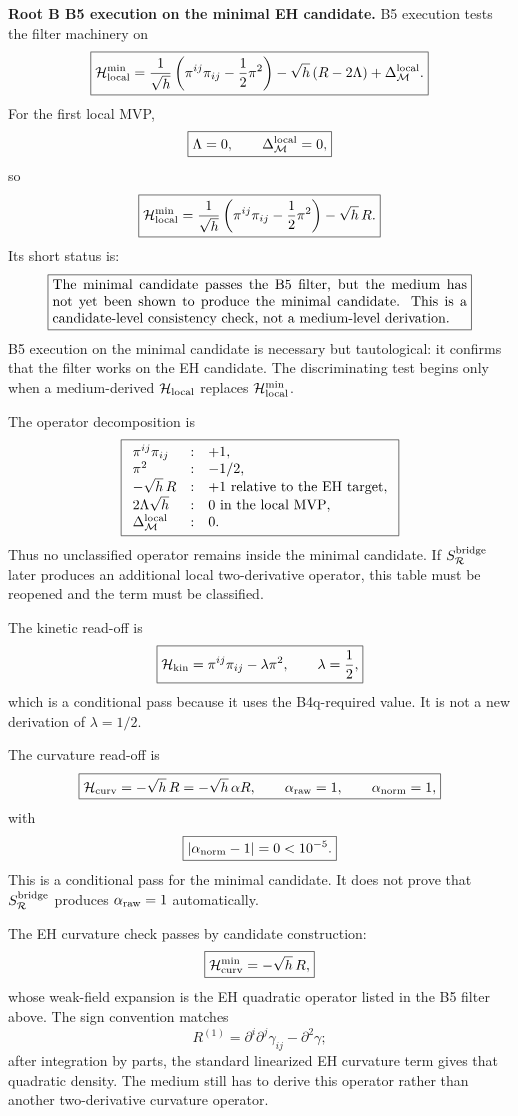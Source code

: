 \documentclass[11pt]{article}
\begin{document}
\medskip\noindent\textbf{Root B B5 execution on the minimal EH candidate.}
B5 execution tests the filter machinery on
\[
\boxed{
{\cal H}_{\rm local}^{\rm min}
=\frac{1}{\sqrt h}\left(\pi^{ij}\pi_{ij}-\frac12\pi^2\right)
-\sqrt h\,(R-2\Lambda)+\Delta_{\mathcal M}^{\rm local}.
}
\]
For the first local MVP,
\[
\boxed{\Lambda=0,\qquad \Delta_{\mathcal M}^{\rm local}=0,}
\]
so
\[
\boxed{
{\cal H}_{\rm local}^{\rm min}
=\frac{1}{\sqrt h}\left(\pi^{ij}\pi_{ij}-\frac12\pi^2\right)-\sqrt h\,R.
}
\]
Its short status is:
\[
\boxed{
\begin{minipage}{0.86\linewidth}
The minimal candidate passes the B5 filter, but the medium has not yet been
shown to produce the minimal candidate.  This is a candidate-level consistency
check, not a medium-level derivation.
\end{minipage}}
\]
B5 execution on the minimal candidate is necessary but tautological: it
confirms that the filter works on the EH candidate.  The discriminating test
begins only when a medium-derived \({\cal H}_{\rm local}\) replaces
\({\cal H}_{\rm local}^{\rm min}\).

The operator decomposition is
\[
\boxed{
\begin{array}{lll}
\pi^{ij}\pi_{ij} &:& +1,\\
\pi^2 &:& -1/2,\\
-\sqrt h\,R &:& +1\ \text{relative to the EH target},\\
2\Lambda\sqrt h &:& 0\ \text{in the local MVP},\\
\Delta_{\mathcal M}^{\rm local} &:& 0.
\end{array}}
\]
Thus no unclassified operator remains inside the minimal candidate.  If
\(S_{\mathcal R}^{\rm bridge}\) later produces an additional local
two-derivative operator, this table must be reopened and the term must be
classified.

The kinetic read-off is
\[
\boxed{
{\cal H}_{\rm kin}=\pi^{ij}\pi_{ij}-\lambda\pi^2,\qquad
\lambda=\frac12,
}
\]
which is a conditional pass because it uses the B4q-required value.  It is not
a new derivation of \(\lambda=1/2\).

The curvature read-off is
\[
\boxed{
{\cal H}_{\rm curv}=-\sqrt h\,R
=-\sqrt h\,\alpha R,\qquad
\alpha_{\rm raw}=1,\qquad
\alpha_{\rm norm}=1,
}
\]
with
\[
\boxed{|\alpha_{\rm norm}-1|=0<10^{-5}.}
\]
This is a conditional pass for the minimal candidate.  It does not prove that
\(S_{\mathcal R}^{\rm bridge}\) produces \(\alpha_{\rm raw}=1\)
automatically.

The EH curvature check passes by candidate construction:
\[
\boxed{{\cal H}_{\rm curv}^{\rm min}=-\sqrt h\,R,}
\]
whose weak-field expansion is the EH quadratic operator listed in the B5
filter above.  The sign convention matches
\[
R^{(1)}=\partial^i\partial^j\gamma_{ij}-\partial^2\gamma;
\]
after integration by parts, the standard linearized EH curvature term gives
that quadratic density.  The medium still has to derive this operator rather
than another two-derivative curvature operator.
\end{document}
